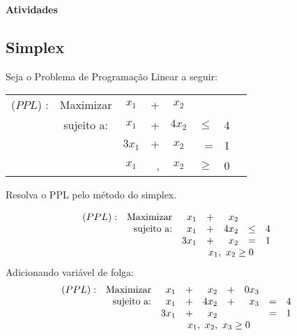 \documentclass[12pt]{exam}
\begin{document}
\printanswers

\begin{center}
\textbf{{\Huge Atividades}}
\end{center}

\begin{questions}

\section*{Simplex}

\question Seja o Problema de Programação Linear a seguir:
	
	\begin{table}[H]
		\centering
			\begin{tabular}{c c c r c r c c }
			($PPL$) :&  Maximizar & $x_1$ & + & $x_2$   &  & &	\\
			& sujeito a: & $x_1$ & + & $4x_2$  & $\leq $ &	 4 \\
			 & & $3x_1$ & $+$ & $x_2$ &  = &	 1 \\
			 & & $x_1$ & , & $x_2$ &  $\geq$ &	 0
			\end{tabular}
	\end{table}	
	Resolva o PPL pelo método do simplex.
	
	\begin{solution}

	\begin{equation*}	
			\begin{array}{c r r c r c c c }
			(PPL) :& \text{Maximizar} & x_1  & + &  x_2    &  & &	\\
			           & \text{sujeito a:}  & x_1 & + & 4x_2  &  \leq  &	 4 \\
			           &                              & 3x_1 & + & x_2 &  = &	 1 \\
			           &                              & \multicolumn{6}{c}{x_1,~x_2 \geq 0}
			\end{array}	
	\end{equation*}
Adicionando variável de folga:
	\begin{equation*}	
			\begin{array}{c r r c r crc c c }
			(PPL) :& \text{Maximizar} & x_1   & + &  x_2   & + & 0x_3 &  & &	\\
			           & \text{sujeito a:}  & x_1   & + & 4x_2  & + &  x_3 &  =  &	 4 \\
			           &                              & 3x_1 & + & x_2    &     &        &  =  &	 1 \\
			           &                              & \multicolumn{6}{c}{x_1,~x_2,~x_3 \geq 0}
			\end{array}	
	\end{equation*}
	

\end{solution}
\end{questions}
\end{document}
